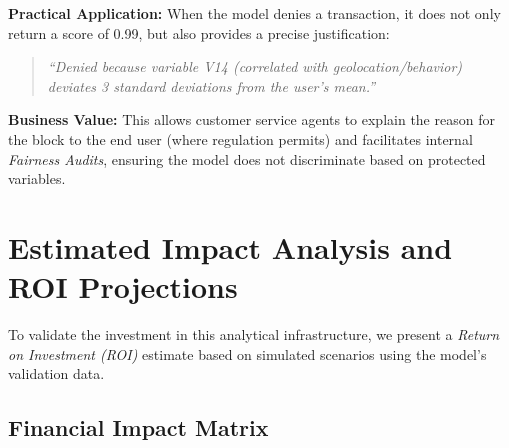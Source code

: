 \documentclass[12pt,a4paper]{report}
\begin{document}
\textbf{Practical Application:} When the model denies a transaction, it does not only return a score of 0.99, but also provides a precise justification:  

\begin{quote}
\textit{\textquotedblleft Denied because variable V14 (correlated with geolocation/behavior) deviates 3 standard deviations from the user's mean.\textquotedblright}
\end{quote}

\textbf{Business Value:} This allows customer service agents to explain the reason for the block to the end user (where regulation permits) and facilitates internal \textit{Fairness Audits}, ensuring the model does not discriminate based on protected variables.




\section{Estimated Impact Analysis and ROI Projections}

To validate the investment in this analytical infrastructure, we present a \textit{Return on Investment (ROI)} estimate based on simulated scenarios using the model's validation data.

\subsection{Financial Impact Matrix}
\end{document}
